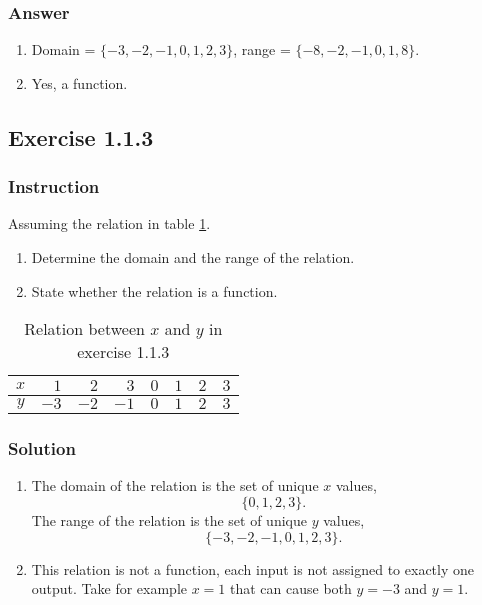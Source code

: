 \documentclass[11pt, letterpaper, oneside]{memoir}
\begin{document}
\subsubsection{Answer}

\begin{enumerate}[label=(\alph*)]
  \item Domain = $ \{ -3, -2, -1, 0, 1, 2, 3 \} $, range = $ \{ -8, -2, -1, 0, 1, 8\} $.
  \item Yes, a function.
\end{enumerate}

\subsection*{Exercise 1.1.3}

\subsubsection{Instruction}

Assuming the relation in table \ref{table:exercise-1.1.3}.
\begin{enumerate}[label=(\alph*)]
  \item Determine the domain and the range of the relation.
  \item State whether the relation is a function.
\end{enumerate}

\begin{table}[ht]
  \centering
  \begin{tabular}{ c | r r r r r r r }
    \hline
    $ x $ & $ 1 $ & $ 2 $ & $ 3 $ & $ 0 $ & $ 1 $ & $ 2 $ & $ 3 $ \\
    \hline
    $ y $ & $ -3 $ & $ -2 $ & $ -1 $ & $ 0 $ & $ 1 $ & $ 2 $ & $ 3 $ \\
    \hline
  \end{tabular}
  \caption{Relation between $ x $ and $ y $ in exercise 1.1.3}
  \label{table:exercise-1.1.3}
\end{table}

\subsubsection{Solution}

\begin{enumerate}[label=(\alph*)]
  \item The domain of the relation is the set of unique $ x $ values,
    $$ \phantom{.}
    \{ 0, 1, 2, 3 \}
    .$$
    The range of the relation is the set of unique $ y $ values,
    $$ \phantom{.}
    \{ -3, -2, -1, 0, 1, 2, 3 \}
    .$$
  \item This relation is not a function, each input is not assigned to exactly one output. Take for example $ x = 1 $ that can cause both $ y = -3 $ and $ y = 1 $.
\end{enumerate}
\end{document}
